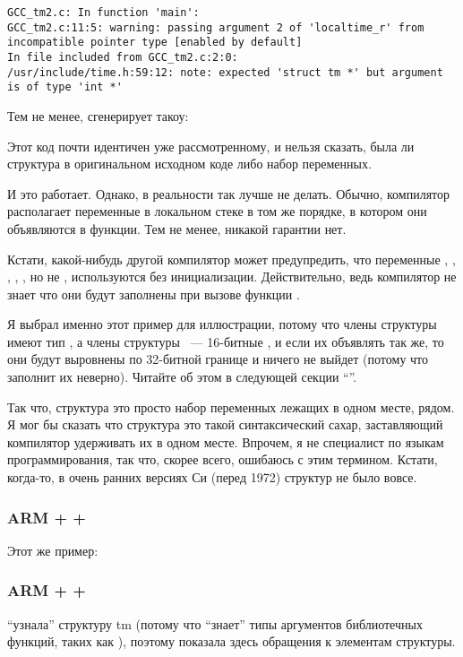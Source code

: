 \begin{lstlisting}[caption=GCC 4.7.3]
GCC_tm2.c: In function 'main':
GCC_tm2.c:11:5: warning: passing argument 2 of 'localtime_r' from incompatible pointer type [enabled by default]
In file included from GCC_tm2.c:2:0:
/usr/include/time.h:59:12: note: expected 'struct tm *' but argument is of type 'int *'
\end{lstlisting}

Тем не менее, сгенерирует такоу:



Этот код почти идентичен уже рассмотренному, и нельзя сказать, была ли структура
в оригинальном исходном коде либо набор переменных.

И это работает. Однако, в реальности так лучше не делать. Обычно, компилятор располагает переменные в локальном
стеке в том же порядке, в котором они объявляются в функции. Тем не менее, никакой гарантии нет.

Кстати, какой-нибудь другой компилятор может предупредить, что переменные , , ,
, , но не , используются без инициализации. 
Действительно, ведь компилятор не знает
что они будут заполнены при вызове функции .

Я выбрал именно этот пример для иллюстрации, потому что члены структуры имеют тип \Tint, а члены структуры
 ~--- 16-битные , и если их объявлять так же, то они будут выровнены по 32-битной границе 
и ничего не выйдет (потому что  заполнит их неверно). Читайте об этом в следующей секции
``\StructurePackingSectionName''.

\index{\SyntacticSugar}
Так что, структура это просто набор переменных лежащих в одном месте, рядом. Я мог бы сказать что структура
это такой синтаксический сахар, заставляющий компилятор удерживать их в одном месте. Впрочем, я не специалист
по языкам программирования, так что, скорее всего, ошибаюсь с этим термином.
Кстати, когда-то, в очень ранних версиях Си (перед 1972) структур не 
было вовсе\cite{Ritchie:1993:DCL:155360.155580}.

\subsubsection{ARM + \OptimizingKeil + \ThumbMode}

Этот же пример:



\subsubsection{ARM + \OptimizingXcode + \ThumbTwoMode}

\IDA ``узнала'' структуру tm (потому что \IDA ``знает'' типы аргументов библиотечных функций, 
таких как ), поэтому показала здесь обращения к элементам структуры.



